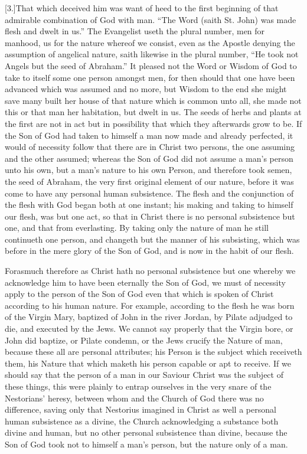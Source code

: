 [3.]That which deceived him was want of heed to the first beginning of that admirable combination of God with man. “The Word (saith St. John) was made flesh and dwelt in us.” The Evangelist useth the plural number, men for manhood, us for the nature whereof we consist, even as the Apostle denying the assumption of angelical nature, saith likewise in the plural number, “He took not Angels but the seed of Abraham.” It pleased not the Word or Wisdom of God to take to itself some one person amongst men, for then should that one have been advanced which was assumed and no more, but Wisdom to the end she might save many built her house of that nature which is common unto all, she made not this or that man her habitation, but dwelt in us. The seeds of herbs and plants at the first are not in act but in possibility that which they afterwards grow to be. If the Son of God had taken to himself a man now made and already perfected, it would of necessity follow that there are in Christ two persons, the one assuming and the other assumed; whereas the Son of God did not assume a man’s person unto his own, but a man’s nature to his own Person, and therefore took semen, the seed of Abraham, the very first original element of our nature, before it was come to have any personal human subsistence. The flesh and the conjunction of the flesh with God began both at one  instant; his making and taking to himself our flesh, was but one act, so that in Christ there is no personal subsistence but one, and that from everlasting. By taking only the nature of man he still continueth one person, and changeth but the manner of his subsisting, which was before in the mere glory of the Son of God, and is now in the habit of our flesh.

Forasmuch therefore as Christ hath no personal subsistence but one whereby we acknowledge him to have been eternally the Son of God, we must of necessity apply to the person of the Son of God even that which is spoken of Christ according to his human nature. For example, according to the flesh he was born of the Virgin Mary, baptized of John in the river Jordan, by Pilate adjudged to die, and executed by the Jews. We cannot say properly that the Virgin bore, or John did baptize, or Pilate condemn, or the Jews crucify the Nature of man, because these all are personal attributes; his Person is the subject which receiveth them, his Nature that which maketh his person capable or apt to receive. If we should say that the person of a man in our Saviour Christ was the subject of these things, this were plainly to entrap ourselves in the very snare of the Nestorians’ heresy, between whom and the Church of God there was no difference, saving only that Nestorius imagined in Christ as well a personal human subsistence as a divine, the Church acknowledging a substance both divine and human, but no other personal subsistence than divine, because the Son of God took not to himself a man’s person, but the nature only of a man.

